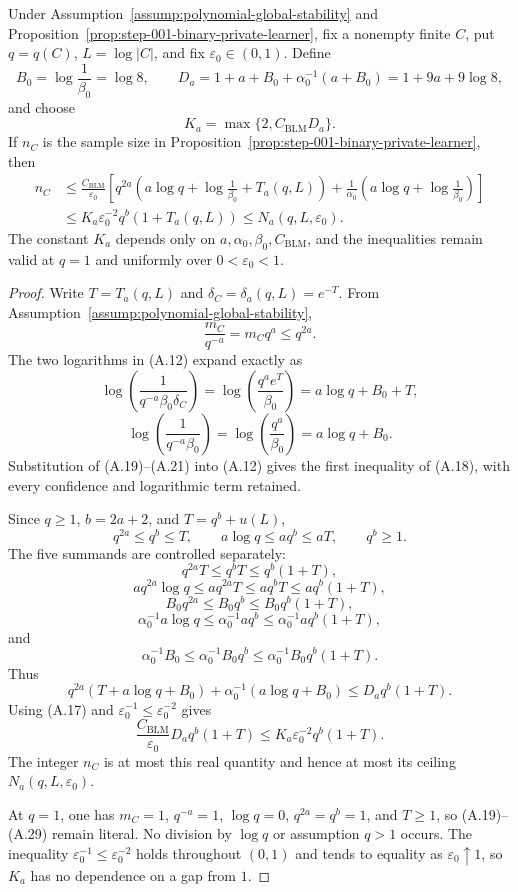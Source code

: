 \begin{lemma}
\label{lem:step-002-sc-domination}
Under Assumption~\ref{assump:polynomial-global-stability} and
Proposition~\ref{prop:step-001-binary-private-learner}, fix a
nonempty finite \(C\), put \(q=q(C)\), \(L=\log|C|\), and fix
\(\varepsilon_0\in(0,1)\).  Define
\[
B_0=\log\frac1{\beta_0}=\log 8,
\qquad
D_a=1+a+B_0+\alpha_0^{-1}(a+B_0)
=1+9a+9\log 8,
\tag{A.16}
\]
and choose
\[
K_a=\max\{2,C_{\mathrm{BLM}}D_a\}.
\tag{A.17}
\]
If \(n_C\) is the sample size in
Proposition~\ref{prop:step-001-binary-private-learner}, then
\[
\begin{aligned}
n_C
&\leq \frac{C_{\mathrm{BLM}}}{\varepsilon_0}
\left[
q^{2a}\!\left(
a\log q+\log\frac1{\beta_0}+T_a(q,L)
\right)
+\frac1{\alpha_0}
\left(a\log q+\log\frac1{\beta_0}\right)
\right]\\
&\leq K_a\varepsilon_0^{-2}q^b(1+T_a(q,L))
\leq N_a(q,L,\varepsilon_0).
\end{aligned}
\tag{A.18}
\]
The constant \(K_a\) depends only on
\(a,\alpha_0,\beta_0,C_{\mathrm{BLM}}\), and the inequalities remain
valid at \(q=1\) and uniformly over \(0<\varepsilon_0<1\).
\end{lemma}

\begin{proof}
Write \(T=T_a(q,L)\) and
\(\delta_C=\delta_a(q,L)=e^{-T}\).  From
Assumption~\ref{assump:polynomial-global-stability},
\[
\frac{m_C}{q^{-a}}=m_Cq^a\leq q^{2a}.
\tag{A.19}
\]
The two logarithms in (A.12) expand exactly as
\[
\log\!\left(\frac1{q^{-a}\beta_0\delta_C}\right)
=\log\!\left(\frac{q^ae^T}{\beta_0}\right)
=a\log q+B_0+T,
\tag{A.20}
\]
\[
\log\!\left(\frac1{q^{-a}\beta_0}\right)
=\log\!\left(\frac{q^a}{\beta_0}\right)
=a\log q+B_0.
\tag{A.21}
\]
Substitution of (A.19)--(A.21) into (A.12) gives the first inequality
of (A.18), with every confidence and logarithmic term retained.

Since \(q\geq1\), \(b=2a+2\), and
\(T=q^b+u(L)\),
\[
q^{2a}\leq q^b\leq T,\qquad
a\log q\leq aq^b\leq aT,\qquad
q^b\geq1.
\tag{A.22}
\]
The five summands are controlled separately:
\[
q^{2a}T\leq q^bT\leq q^b(1+T),
\tag{A.23}
\]
\[
aq^{2a}\log q
\leq aq^{2a}T
\leq aq^bT
\leq aq^b(1+T),
\tag{A.24}
\]
\[
B_0q^{2a}
\leq B_0q^b
\leq B_0q^b(1+T),
\tag{A.25}
\]
\[
\alpha_0^{-1}a\log q
\leq\alpha_0^{-1}aq^b
\leq\alpha_0^{-1}aq^b(1+T),
\tag{A.26}
\]
and
\[
\alpha_0^{-1}B_0
\leq\alpha_0^{-1}B_0q^b
\leq\alpha_0^{-1}B_0q^b(1+T).
\tag{A.27}
\]
Thus
\[
q^{2a}(T+a\log q+B_0)
+\alpha_0^{-1}(a\log q+B_0)
\leq D_aq^b(1+T).
\tag{A.28}
\]
Using (A.17) and
\(\varepsilon_0^{-1}\leq\varepsilon_0^{-2}\) gives
\[
\frac{C_{\mathrm{BLM}}}{\varepsilon_0}
D_aq^b(1+T)
\leq
K_a\varepsilon_0^{-2}q^b(1+T).
\tag{A.29}
\]
The integer \(n_C\) is at most this real quantity and hence at most
its ceiling \(N_a(q,L,\varepsilon_0)\).

At \(q=1\), one has \(m_C=1\), \(q^{-a}=1\),
\(\log q=0\), \(q^{2a}=q^b=1\), and \(T\geq1\), so
(A.19)--(A.29) remain literal.  No division by \(\log q\) or
assumption \(q>1\) occurs.  The inequality
\(\varepsilon_0^{-1}\leq\varepsilon_0^{-2}\) holds throughout
\((0,1)\) and tends to equality as \(\varepsilon_0\uparrow1\), so
\(K_a\) has no dependence on a gap from \(1\).
\end{proof}

